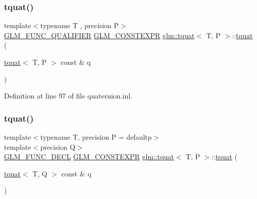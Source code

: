 \mbox{\label{structglm_1_1tquat_aa7af0d1b2fd1ed7db63d48b241b295ca}} 
\subsubsection{\texorpdfstring{tquat()}{tquat()}\hspace{0.1cm}{\footnotesize\ttfamily [2/13]}}
{\footnotesize\ttfamily template$<$typename T , precision P$>$ \\
\mbox{\hyperlink{setup_8hpp_a33fdea6f91c5f834105f7415e2a64407}{G\+L\+M\+\_\+\+F\+U\+N\+C\+\_\+\+Q\+U\+A\+L\+I\+F\+I\+ER}} \mbox{\hyperlink{setup_8hpp_a08b807947b47031d3a511f03f89645ad}{G\+L\+M\+\_\+\+C\+O\+N\+S\+T\+E\+X\+PR}} \mbox{\hyperlink{structglm_1_1tquat}{glm\+::tquat}}$<$ T, P $>$\+::\mbox{\hyperlink{structglm_1_1tquat}{tquat}} (\begin{DoxyParamCaption}\item[{\mbox{\hyperlink{structglm_1_1tquat}{tquat}}$<$ T, P $>$ const \&}]{q }\end{DoxyParamCaption})}



Definition at line 97 of file quaternion.\+inl.

\mbox{\label{structglm_1_1tquat_aaf9a4d10e16ad975e4462b5c89ce724d}} 
\subsubsection{\texorpdfstring{tquat()}{tquat()}\hspace{0.1cm}{\footnotesize\ttfamily [3/13]}}
{\footnotesize\ttfamily template$<$typename T, precision P = defaultp$>$ \\
template$<$precision Q$>$ \\
\mbox{\hyperlink{setup_8hpp_ab2d052de21a70539923e9bcbf6e83a51}{G\+L\+M\+\_\+\+F\+U\+N\+C\+\_\+\+D\+E\+CL}} \mbox{\hyperlink{setup_8hpp_a08b807947b47031d3a511f03f89645ad}{G\+L\+M\+\_\+\+C\+O\+N\+S\+T\+E\+X\+PR}} \mbox{\hyperlink{structglm_1_1tquat}{glm\+::tquat}}$<$ T, P $>$\+::\mbox{\hyperlink{structglm_1_1tquat}{tquat}} (\begin{DoxyParamCaption}\item[{\mbox{\hyperlink{structglm_1_1tquat}{tquat}}$<$ T, Q $>$ const \&}]{q }\end{DoxyParamCaption})}

